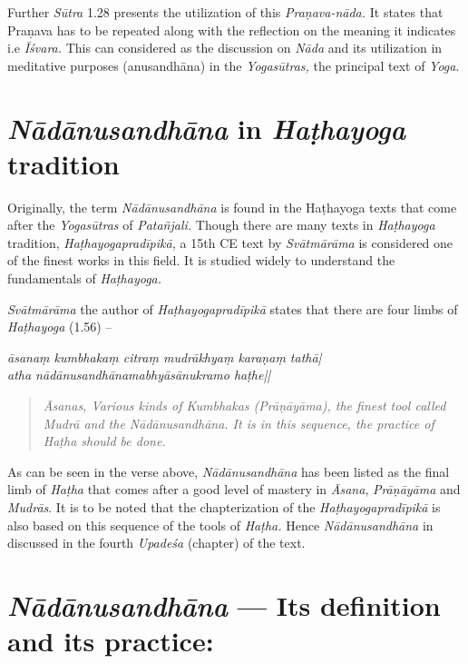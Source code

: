 Further \textit{Sūtra} 1.28 presents the utilization of this \textit{Praṇava-nāda.} It states that Praṇava has to be repeated along with the reflection on the meaning it indicates i.e \textit{Īśvara.} This can considered as the discussion on \textit{Nāda} and its utilization in meditative purposes (anusandhāna)  in the \textit{Yogasūtras,} the principal text of \textit{Yoga}.

\section*{\textit{Nādānusandhāna} in \textit{Haṭhayoga} tradition}

Originally, the term \textit{Nādānusandhāna} is found in the Haṭhayoga texts that come after the \textit{Yogasūtras} of \textit{Patañjali.} Though there are many texts in \textit{Haṭhayoga} tradition, \textit{Haṭhayogapradīpikā,} a 15th CE text by \textit{Svātmārāma} is considered one of the finest works in this field. It is studied widely to understand the fundamentals of \textit{Haṭhayoga.}

\textit{Svātmārāma} the author of \textit{Haṭhayogapradīpikā} states that there are four limbs of \textit{Haṭhayoga} (1.56) –

\begin{shloka}
\textit{āsanaṃ kumbhakaṃ citraṃ mudrākhyaṃ karaṇaṃ tathā|}\\
\textit{atha nādānusandhānamabhyāsānukramo haṭhe||}
\end{shloka}

\begin{quote}
\textit{Āsanas, Various kinds of Kumbhakas (Prāṇāyāma), the finest tool called Mudrā and the Nādānusandhāna. It is in this sequence, the practice of Haṭha should be done.}
\end{quote}

As can be seen in the verse above, \textit{Nādānusandhāna} has been listed as the final limb of \textit{Haṭha} that comes after a good level of mastery in \textit{Āsana}, \textit{Prāṇāyāma} and \textit{Mudrās}. It is to be noted that the chapterization of the \textit{Haṭhayogapradīpikā} is also based on this sequence of the tools of \textit{Haṭha.} Hence \textit{Nādānusandhāna} in discussed in the fourth \textit{Upadeśa} (chapter) of the text.   

\section*{\textit{Nādānusandhāna} ---  Its definition and its practice:}

